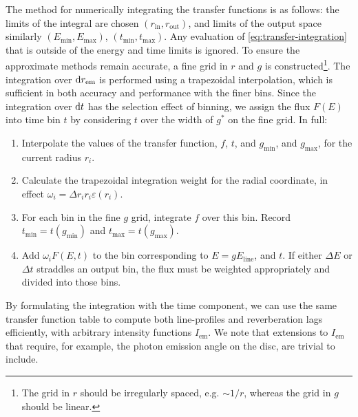 The method for numerically integrating the transfer functions is as follows: the limits of the integral are chosen $(r_\text{in}, r_\text{out})$, and limits of the output space similarly $(E_\text{min}, E_\text{max})$, $(t_\text{min}, t_\text{max})$. Any evaluation of \eqref{eq:transfer-integration} that is outside of the energy and time limits is ignored. To ensure the approximate methods remain accurate, a fine grid in $r$ and $g$ is constructed\footnote{The grid in $r$ should be irregularly spaced, e.g. $\sim 1 / r$, whereas the grid in $g$ should be linear.}. The integration over $\text{d} r_\text{em}$ is performed using a trapezoidal interpolation, which is sufficient in both accuracy and performance with the finer bins. Since the integration over $\text{d} t$ has the selection effect of binning, we assign the flux $F(E)$ into time bin $t$ by considering $t$ over the width of $g^\ast$ on the fine grid. In full:
\begin{enumerate}
    \item Interpolate the values of the transfer function, $f$, $t$, and $g_\text{min}$, and $g_\text{max}$, for the current radius $r_i$.
    \item Calculate the trapezoidal integration weight for the radial coordinate, in effect $\omega_i = \Delta r_i r_i \varepsilon(r_i)$.
    \item For each bin in the fine $g$ grid, integrate $f$ over this bin. Record $t_\text{min} = t(g_\text{min})$ and $t_\text{max} = t(g_\text{max})$.
    \item Add $\omega_i F(E, t)$ to the bin corresponding to $E = gE_\text{line}$, and $t$. If either $\Delta E$ or $\Delta t$ straddles an output bin, the flux must be weighted appropriately and divided into those bins. 
\end{enumerate}

By formulating the integration with the time component, we can use the same transfer function table to compute both line-profiles and reverberation lags efficiently, with arbitrary intensity functions $I_\text{em}$. We note that extensions to $I_\text{em}$ that require, for example, the photon emission angle on the disc, are trivial to include.

